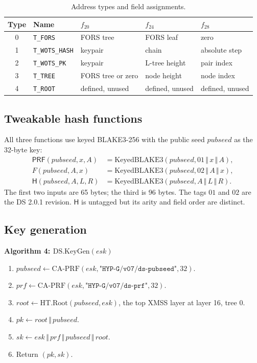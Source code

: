 \documentclass[runningheads]{llncs}
\newcommand{\concat}{\,\Vert\,}
\newcommand{\Hash}{\mathsf{H}}
\newcommand{\PRF}{\mathsf{PRF}}
\newenvironment{steps}[1]
  {\par\medskip\noindent\textbf{#1}\par\nopagebreak\small
   \begin{enumerate}[label=\arabic*:,leftmargin=*]}
  {\end{enumerate}\par\medskip}
\begin{document}
\begin{table}[t]
\centering
\small
\begin{tabular}{@{}cllll@{}}
\toprule
Type & Name & $f_{20}$ & $f_{24}$ & $f_{28}$ \\
\midrule
0 & \texttt{T\_FORS} & FORS tree & FORS leaf & zero \\
1 & \texttt{T\_WOTS\_HASH} & keypair & chain & absolute step \\
2 & \texttt{T\_WOTS\_PK} & keypair & L-tree height & pair index \\
3 & \texttt{T\_TREE} & FORS tree or zero & node height & node index \\
4 & \texttt{T\_ROOT} & defined, unused & defined, unused & defined, unused \\
\bottomrule
\end{tabular}
\caption{Address types and field assignments.}
\label{tab:adrs}
\end{table}

\subsection{Tweakable hash functions}

All three functions use keyed BLAKE3-256 with the public seed
$\mathit{pubseed}$ as the 32-byte key:
\[
\begin{aligned}
 \PRF(\mathit{pubseed},x,A)
   &=\mathrm{KeyedBLAKE3}(\mathit{pubseed},
     01\concat x\concat A),\\
 F(\mathit{pubseed},A,x)
   &=\mathrm{KeyedBLAKE3}(\mathit{pubseed},
     02\concat A\concat x),\\
 \Hash(\mathit{pubseed},A,L,R)
   &=\mathrm{KeyedBLAKE3}(\mathit{pubseed},
     A\concat L\concat R).
\end{aligned}
\]
The first two inputs are 65 bytes; the third is 96 bytes.  The tags
$01$ and $02$ are the DS 2.0.1 revision.  $\Hash$ is untagged but its
arity and field order are distinct.

\subsection{Key generation}

\begin{steps}{Algorithm 4: $\mathrm{DS.KeyGen}(\mathit{esk})$}
\item $\mathit{pubseed}\gets\mathrm{CA\text{-}PRF}(\mathit{esk},
  \texttt{"HYP-G/v07/ds-pubseed"},32)$.
\item $\mathit{prf}\gets\mathrm{CA\text{-}PRF}(\mathit{esk},
  \texttt{"HYP-G/v07/ds-prf"},32)$.
\item $\mathit{root}\gets\mathrm{HT.Root}(\mathit{pubseed},
  \mathit{esk})$, the top XMSS layer at layer 16, tree 0.
\item $pk\gets\mathit{root}\concat\mathit{pubseed}$.
\item $sk\gets\mathit{esk}\concat\mathit{prf}\concat
  \mathit{pubseed}\concat\mathit{root}$.
\item Return $(pk,sk)$.
\end{steps}
\end{document}

